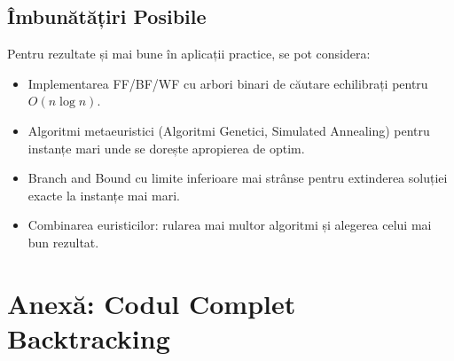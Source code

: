 \documentclass[runningheads]{llncs}
\begin{document}
\subsection{Îmbunătățiri Posibile}

Pentru rezultate și mai bune în aplicații practice, se pot considera:
\begin{itemize}
    \item Implementarea FF/BF/WF cu arbori binari de căutare echilibrați pentru $O(n \log n)$.
    \item Algoritmi metaeuristici (Algoritmi Genetici, Simulated Annealing) pentru instanțe mari unde se dorește apropierea de optim.
    \item Branch and Bound cu limite inferioare mai strânse pentru extinderea soluției exacte la instanțe mai mari.
    \item Combinarea euristicilor: rularea mai multor algoritmi și alegerea celui mai bun rezultat.
\end{itemize}

\section*{Anexă: Codul Complet Backtracking}
\end{document}
